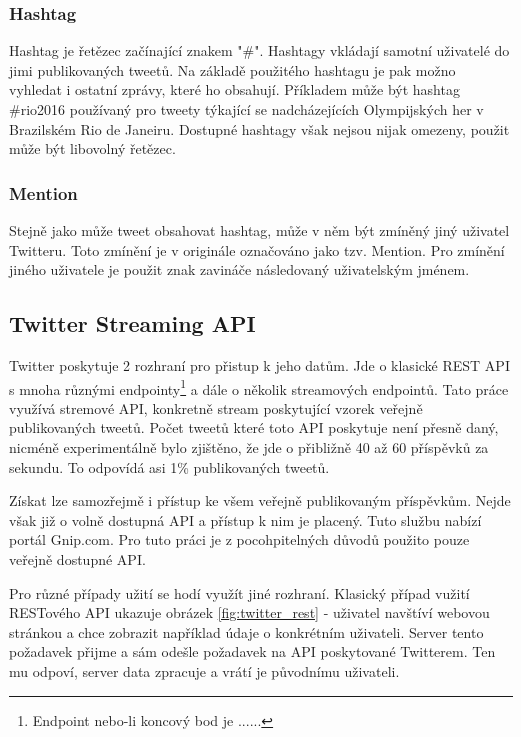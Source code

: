 \documentclass[thesis=B,czech]{FITthesis}[2012/06/26]
\begin{document}
\subsubsection{Hashtag}

	Hashtag je řetězec začínající znakem "\#". Hashtagy vkládají samotní uživatelé do jimi publikovaných tweetů. Na základě použitého hashtagu je pak možno vyhledat i ostatní zprávy, které ho obsahují. Příkladem může být hashtag \#rio2016 používaný pro tweety týkající se nadcházejících Olympijských her v Brazilském Rio de Janeiru. Dostupné hashtagy však nejsou nijak omezeny, použit může být libovolný řetězec. 


\subsubsection{Mention}

	Stejně jako může tweet obsahovat hashtag, může v něm být zmíněný jiný uživatel Twitteru. Toto zmínění je v originále označováno jako tzv. Mention. Pro zmínění jiného uživatele je použit znak zavináče následovaný uživatelským jménem. 


\subsection{Twitter Streaming API}
	Twitter poskytuje 2 rozhraní pro přistup k jeho datům. Jde o klasické REST API s mnoha různými endpointy\footnote{Endpoint nebo-li koncový bod je ......} a dále o několik streamových endpointů. Tato práce využívá stremové API, konkretně stream poskytující vzorek veřejně publikovaných tweetů\cite{twitter-api}. Počet tweetů které toto API poskytuje není přesně daný, nicméně experimentálně bylo zjištěno, že jde o přibližně 40 až 60 příspěvků za sekundu. To odpovídá asi 1\% publikovaných tweetů. 
	
	Získat lze samozřejmě i přístup ke všem veřejně publikovaným příspěvkům. Nejde však již o volně dostupná API a přístup k nim je placený. Tuto službu nabízí portál Gnip.com\cite{gnip}. Pro tuto práci je z pocohpitelných důvodů použito pouze veřejně dostupné API. 
	
	Pro různé případy užití se hodí využít jiné rozhraní. Klasický případ vužití RESTového API ukazuje obrázek \ref{fig:twitter_rest} - uživatel navštíví webovou stránkou a chce zobrazit například údaje o konkrétním uživateli. Server tento požadavek přijme a sám odešle požadavek na API poskytované Twitterem. Ten mu odpoví, server data zpracuje a vrátí je původnímu uživateli. 
\end{document}
